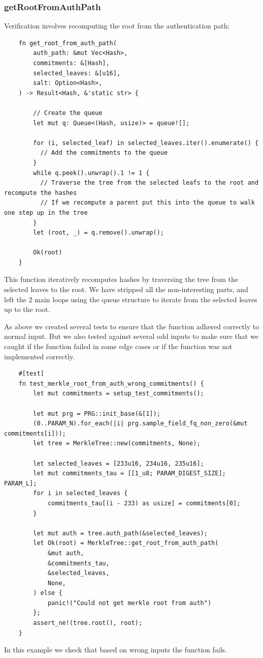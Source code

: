 \documentclass[11pt]{report}
\theoremstyle{definition}
\theoremstyle{plain}
\begin{document}
\subsubsection{getRootFromAuthPath}\label{sub:get_root_from_auth_path}
Verification involves recomputing the root from the authentication path:
\begin{verbatim}
    fn get_root_from_auth_path(
        auth_path: &mut Vec<Hash>,
        commitments: &[Hash],
        selected_leaves: &[u16],
        salt: Option<Hash>,
    ) -> Result<Hash, &'static str> {

        // Create the queue
        let mut q: Queue<(Hash, usize)> = queue![];

        for (i, selected_leaf) in selected_leaves.iter().enumerate() {
          // Add the commitments to the queue
        }
        while q.peek().unwrap().1 != 1 {
          // Traverse the tree from the selected leafs to the root and recompute the hashes
          // If we recompute a parent put this into the queue to walk one step up in the tree
        }
        let (root, _) = q.remove().unwrap();

        Ok(root)
    }
\end{verbatim}
This function iteratively recomputes hashes by traversing the tree from the selected leaves to the root. We have stripped all the non-interesting parts, and left the 2 main loops using the queue structure to iterate from the selected leaves up to the root.

As above we created several tests to ensure that the function adhered correctly to normal input. But we also tested against several odd inputs to make sure that we caught if the function failed in some edge cases or if the function was not implemented correctly.
\begin{verbatim}
    #[test]
    fn test_merkle_root_from_auth_wrong_commitments() {
        let mut commitments = setup_test_commitments();

        let mut prg = PRG::init_base(&[1]);
        (0..PARAM_N).for_each(|i| prg.sample_field_fq_non_zero(&mut commitments[i]));
        let tree = MerkleTree::new(commitments, None);

        let selected_leaves = [233u16, 234u16, 235u16];
        let mut commitments_tau = [[1_u8; PARAM_DIGEST_SIZE]; PARAM_L];
        for i in selected_leaves {
            commitments_tau[(i - 233) as usize] = commitments[0];
        }

        let mut auth = tree.auth_path(&selected_leaves);
        let Ok(root) = MerkleTree::get_root_from_auth_path(
            &mut auth,
            &commitments_tau,
            &selected_leaves,
            None,
        ) else {
            panic!("Could not get merkle root from auth")
        };
        assert_ne!(tree.root(), root);
    }
\end{verbatim}
In this example we check that based on wrong inputs the function fails.
\end{document}

